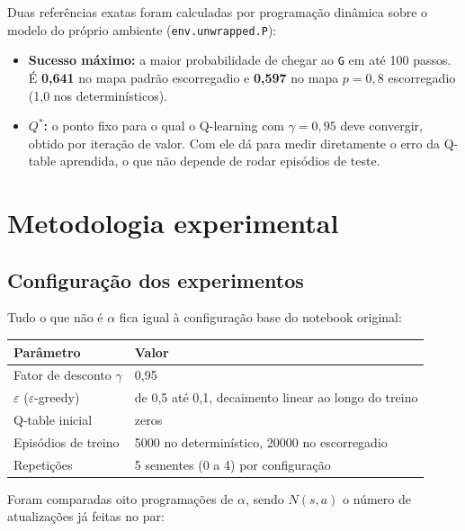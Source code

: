 \documentclass[11pt,a4paper]{article}
\begin{document}
Duas referências exatas foram calculadas por programação dinâmica sobre o modelo do próprio ambiente
(\texttt{env.unwrapped.P}):
\begin{itemize}
  \item \textbf{Sucesso máximo:} a maior probabilidade de chegar ao \texttt{G} em até 100 passos. É \textbf{0,641} no
    mapa padrão escorregadio e \textbf{0,597} no mapa $p = 0{,}8$ escorregadio (1,0 nos determinísticos).
  \item \textbf{$Q^*$:} o ponto fixo para o qual o Q-learning com $\gamma = 0{,}95$ deve convergir, obtido por iteração de
    valor. Com ele dá para medir diretamente o erro da Q-table aprendida, o que não depende de rodar episódios de teste.
\end{itemize}

\section{Metodologia experimental}

\subsection{Configuração dos experimentos}

Tudo o que não é $\alpha$ fica igual à configuração base do notebook original:

\begin{center}
\small
\begin{tabular}{ll}
\toprule
Parâmetro & Valor \\
\midrule
Fator de desconto $\gamma$ & 0,95 \\
$\varepsilon$ ($\varepsilon$-greedy) & de 0,5 até 0,1, decaimento linear ao longo do treino \\
Q-table inicial & zeros \\
Episódios de treino & 5000 no determinístico, 20000 no escorregadio \\
Repetições & 5 sementes (0 a 4) por configuração \\
\bottomrule
\end{tabular}
\end{center}

Foram comparadas oito programações de $\alpha$, sendo $N(s,a)$ o número de atualizações já feitas no par:
\end{document}
